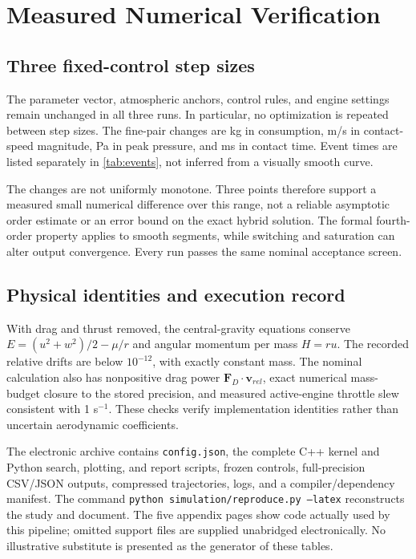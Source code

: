 \documentclass[11pt,a4paper]{article}
\newcommand{\vct}[1]{\bm{#1}}
\begin{document}
\section{Measured Numerical Verification}\label{sec:verification}
\subsection{Three fixed-control step sizes}



The parameter vector, atmospheric anchors, control rules, and engine settings remain unchanged in all three runs. In particular, no optimization is repeated between step sizes. The fine-pair changes are \RFineDm{} kg in consumption, \RFineDv{} m/s in contact-speed magnitude, \RFineDq{} Pa in peak pressure, and \RFineDt{} ms in contact time. Event times are listed separately in \cref{tab:events}, not inferred from a visually smooth curve.

The changes are not uniformly monotone. Three points therefore support a measured small numerical difference over this range, not a reliable asymptotic order estimate or an error bound on the exact hybrid solution. The formal fourth-order property applies to smooth segments, while switching and saturation can alter output convergence. Every run passes the same nominal acceptance screen.
\subsection{Physical identities and execution record}
With drag and thrust removed, the central-gravity equations conserve $E=(u^2+w^2)/2-\mu/r$ and angular momentum per mass $H=ru$. The recorded relative drifts are below $10^{-12}$, with exactly constant mass. The nominal calculation also has nonpositive drag power $\vct F_D\cdot\vct v_{rel}$, exact numerical mass-budget closure to the stored precision, and measured active-engine throttle slew consistent with 1 s$^{-1}$. These checks verify implementation identities rather than uncertain aerodynamic coefficients.


The electronic archive contains \texttt{config.json}, the complete C++ kernel and Python search, plotting, and report scripts, frozen controls, full-precision CSV/JSON outputs, compressed trajectories, logs, and a compiler/dependency manifest. The command \texttt{python simulation/reproduce.py --latex} reconstructs the study and document. The five appendix pages show code actually used by this pipeline; omitted support files are supplied unabridged electronically. No illustrative substitute is presented as the generator of these tables.
\end{document}
